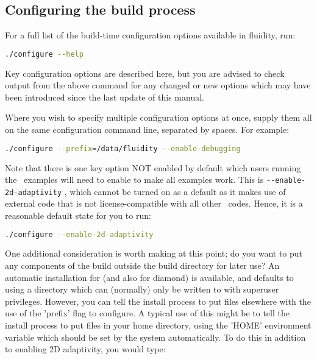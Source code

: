 \subsection{Configuring the build process}
\label{sec:configuring_the_build_process}

For a full list of the build-time configuration options available in fluidity,
run:

\begin{lstlisting}[language=Bash]
./configure --help
\end{lstlisting}

Key configuration options are described here, but you are advised to check
output from the above command for any changed or new options which may have
been introduced since the last update of this manual.

Where you wish to specify multiple configuration options at once, supply them
all on the same configuration command line, separated by spaces. For example:

\begin{lstlisting}[language=Bash]
./configure --prefix=/data/fluidity --enable-debugging
\end{lstlisting}

Note that there is one key option NOT enabled by default which users running
the \fluidity\ examples will need to enable to make all examples work. This is
\lstinline[language=Bash]+--enable-2d-adaptivity+ , which cannot be turned on
as a default as it makes use of external code that is not license-compatible
with all other \fluidity\ codes. Hence, it is a reasonable default state for
you to run:

\begin{lstlisting}[language=Bash]
./configure --enable-2d-adaptivity
\end{lstlisting}

One additional consideration is worth making at this point; do you want to put
any components of the \fluidity build outside the build directory for later
use?  An automatic installation for \fluidity (and also for diamond) is
available, and defaults to using a directory which can (normally) only be
written to with superuser privileges. However, you can tell the install process
to put files elsewhere with the use of the 'prefix' flag to configure. A
typical use of this might be to tell the install process to put files in your
home directory, using the 'HOME' environment variable which should be set by
the system automatically. To do this in addition to enabling 2D adaptivity, you
would type:

